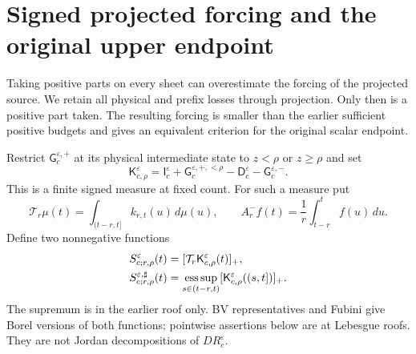 \section{Signed projected forcing and the original upper endpoint}
\label{sec:v94-signed}
Taking positive parts on every sheet can overestimate the forcing of
the projected source. We retain all physical and prefix losses through
projection. Only then is a positive part taken. The resulting forcing
is smaller than the earlier sufficient positive budgets and gives an
equivalent criterion for the original scalar endpoint.

Restrict $\mathsf G_c^{\varepsilon,+}$ at its physical intermediate
state to $z<\rho$ or $z\ge\rho$ and set
\begin{equation}\label{eq:v94-net-measure}
 \mathsf K_{c,\rho}^\varepsilon
 =\mathsf I_c^\varepsilon+\mathsf G_c^{\varepsilon,+,<\rho}
               -\mathsf D_c^\varepsilon-\mathsf G_c^{\varepsilon,-}.
\end{equation}
This is a finite signed measure at fixed count. For such a measure put
\[
 \mathcal T_r\mu(t)=\int_{(t-r,t]}k_{r,t}(u)\,d\mu(u),\qquad
 A_r^-f(t)=\frac1r\int_{t-r}^t f(u)\,du.
\]
Define two nonnegative functions
\begin{align}
 S_{c;r,\rho}^\varepsilon(t)
    &=[\mathcal T_r\mathsf K_{c,\rho}^\varepsilon(t)]_+,\notag\\
 S_{c;r,\rho}^{\varepsilon,\sharp}(t)
    &=\operatorname*{ess\,sup}_{s\in(t-r,t)}
              [\mathsf K_{c,\rho}^\varepsilon((s,t])]_+.
                                             \label{eq:v94-signed-forcing}
\end{align}
The supremum is in the earlier roof only. BV representatives and
Fubini give Borel versions of both functions; pointwise assertions
below are at Lebesgue roofs. They are not Jordan decompositions of
$D R_c^\varepsilon$.

